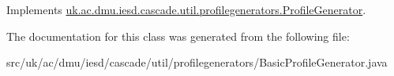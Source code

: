 Implements \hyperlink{interfaceuk_1_1ac_1_1dmu_1_1iesd_1_1cascade_1_1util_1_1profilegenerators_1_1_profile_generator_a682b86a89f79bf5500b8c7b4f1eeddba}{uk.\-ac.\-dmu.\-iesd.\-cascade.\-util.\-profilegenerators.\-Profile\-Generator}.



The documentation for this class was generated from the following file\-:\begin{DoxyCompactItemize}
\item 
src/uk/ac/dmu/iesd/cascade/util/profilegenerators/Basic\-Profile\-Generator.\-java\end{DoxyCompactItemize}
